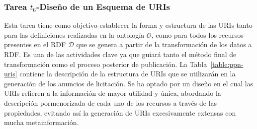 \subsubsection{Tarea $t_6$-Diseño de un Esquema de URIs}
Esta tarea tiene como objetivo establecer la forma y estructura de las URIs tanto para las definiciones 
realizadas en la ontología $\mathcal{O}$, como para todos los recursos presentes en el \dataset RDF $\mathcal{D}$ que 
se genera a partir de la transformación de los datos a \gls{RDF}. Es una de las actividades clave ya que guiará 
tanto el método final de transformación como el proceso posterior de publicación. La Tabla~\ref{table:ppn-uris} contiene 
la descripción de la estructura de \gls{URI}s que se utilizarán en la generación de los anuncios de licitación. Se ha optado 
por un diseño en el cual las URIs refieren a la información de mayor utilidad y única, abordando la descripción pormenorizada 
de cada uno de los recursos a través de las propiedades, evitando así la generación de URIs excesivamente extensas con 
mucha metainformación.
% 
